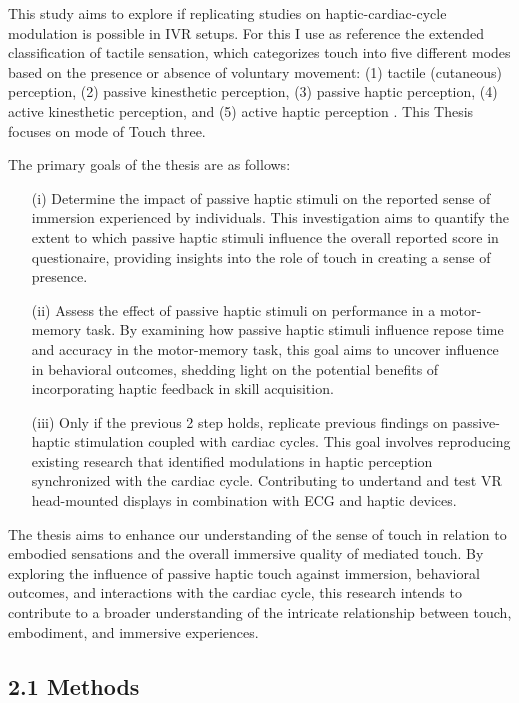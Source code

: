 \documentclass[12pt,oneside,openright]{report}
\begin{document}
This study aims to explore if replicating studies on haptic-cardiac-cycle modulation is possible in IVR setups. For this I use as reference the extended classification of tactile sensation, which categorizes touch into five different modes based on the presence or absence of voluntary movement: (1) tactile (cutaneous) perception, (2) passive kinesthetic perception, (3) passive haptic perception, (4) active kinesthetic perception, and (5) active haptic perception \cite{Healy2003HandbookOP}. This Thesis focuses on mode of Touch three. 

The primary goals of the thesis are as follows:
  \begin{itemize}
    \item[(i)] Determine the impact of passive haptic stimuli on the reported sense of immersion experienced by individuals. This investigation aims to quantify the extent to which passive haptic stimuli influence the overall reported score in questionaire, providing insights into the role of touch in creating a sense of presence.
    \item[(ii)] Assess the effect of passive haptic stimuli on performance in a motor-memory task. By examining how passive haptic stimuli influence repose time and accuracy in the motor-memory task, this goal aims to uncover influence in behavioral outcomes, shedding light on the potential benefits of incorporating haptic feedback in skill acquisition.
    \item[(iii)] Only if the previous 2 step holds, replicate previous findings on passive-haptic stimulation coupled with cardiac cycles. This goal involves reproducing existing research that identified modulations in haptic perception synchronized with the cardiac cycle. Contributing to undertand and test VR head-mounted displays in combination with ECG and haptic devices.
  \end{itemize}

  The thesis aims to enhance our understanding of the sense of touch in relation to embodied sensations and the overall immersive quality of mediated touch. By exploring the influence of passive haptic touch against immersion, behavioral outcomes, and interactions with the cardiac cycle, this research intends to contribute to a broader understanding of the intricate relationship between touch, embodiment, and immersive experiences.

\subsection*{2.1 Methods}
\end{document}
